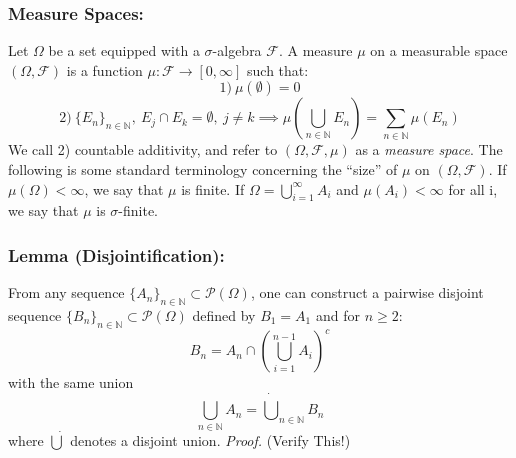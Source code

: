 \documentclass{article}
\begin{document}
\subsubsection{Measure Spaces:} Let $\Omega$ be a set equipped with a $\sigma$-algebra $\mathcal{F}$. A measure $\mu$ on a measurable space $(\Omega, \mathcal{F})$ is a function $\mu: \mathcal{F} \to [0, \infty]$ such that:
\[
1) \ \mu(\emptyset) = 0
\]
\[
2) \ \{E_n\}_{n \in \mathbb{N}}, \ E_j \cap E_k =\emptyset, \ j\neq k \implies \mu(\bigcup_{n\in \mathbb{N}}E_n) = \sum_{n \in \mathbb{N}}\mu(E_n)
\]
We call 2) countable additivity, and refer to  $(\Omega, \mathcal{F}, \mu)$ as a \emph{measure space}. \newline \newline
The following is some standard terminology concerning the ``size'' of $\mu$ on $(\Omega,\mathcal{F})$. If $\mu(\Omega)<\infty$, we say that $\mu$ is finite. If $\Omega = \bigcup_{i=1}^{\infty}A_i$ and $\mu(A_i)< \infty$ for all i, we say that $\mu$ is $\sigma$-finite.  \newline \newline



\subsubsection{Lemma (Disjointification):} From any sequence $\{A_n\}_{n \in \mathbb{N}} \subset \mathcal{P}(\Omega)$, one can construct a pairwise disjoint sequence $\{B_n\}_{n \in \mathbb{N}} \subset \mathcal{P}(\Omega)$ defined by $B_1=A_1$ and for $n \geq 2:$
\[
B_n = A_n \cap (\bigcup_{i=1}^{n-1}A_i)^c
\]
with the same union 
\[
\bigcup_{n \in \mathbb{N}}A_n = \dot{\bigcup}_{n\in \mathbb{N}}B_n
\]
where $\dot{\bigcup}$ denotes a disjoint union.\newline \newline
\textit{Proof.} \newline \newline
(Verify This!)
\end{document}
